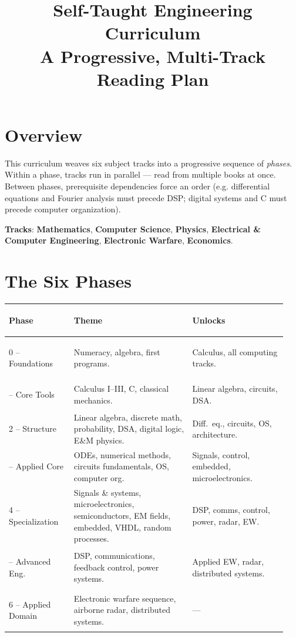 \documentclass[11pt]{article}
\title{\vspace{-2em}Self-Taught Engineering Curriculum\\\large A Progressive, Multi-Track Reading Plan}
\author{}
\date{}
\newcommand{\track}[2]{\textcolor{#1}{\textbf{#2}}}
\begin{document}
\maketitle
\vspace{-3em}

\section*{Overview}

This curriculum weaves six subject tracks into a progressive sequence of
\emph{phases}. Within a phase, tracks run in parallel --- read from multiple
books at once. Between phases, prerequisite dependencies force an order
(e.g. differential equations and Fourier analysis must precede DSP;
digital systems and C must precede computer organization).

\smallskip
\noindent\textbf{Tracks}:
\track{mathcol}{Mathematics},
\track{cscol}{Computer Science},
\track{phycol}{Physics},
\track{eececol}{Electrical \& Computer Engineering},
\track{ewcol}{Electronic Warfare},
\track{econcol}{Economics}.

\section{The Six Phases}

\renewcommand{\arraystretch}{1.2}
\begin{center}
{\small
\begin{tabular}{>{\bfseries\raggedright\arraybackslash}p{0.22\linewidth}
                >{\raggedright\arraybackslash}p{0.40\linewidth}
                >{\raggedright\arraybackslash}p{0.32\linewidth}}
\toprule
\textbf{Phase} & \textbf{Theme} & \textbf{Unlocks} \\
\midrule
\rowcolor{phaseband} 0 -- Foundations & Numeracy, algebra, first programs. & Calculus, all computing tracks. \\
1 -- Core Tools   & Calculus I--III, C, classical mechanics. & Linear algebra, circuits, DSA. \\
\rowcolor{phaseband} 2 -- Structure & Linear algebra, discrete math, probability, DSA, digital logic, E\&M physics. & Diff.\ eq., circuits, OS, architecture. \\
3 -- Applied Core & ODEs, numerical methods, circuits fundamentals, OS, computer org. & Signals, control, embedded, microelectronics. \\
\rowcolor{phaseband} 4 -- Specialization & Signals \& systems, microelectronics, semiconductors, EM fields, embedded, VHDL, random processes. & DSP, comms, control, power, radar, EW. \\
5 -- Advanced Eng. & DSP, communications, feedback control, power systems. & Applied EW, radar, distributed systems. \\
\rowcolor{phaseband} 6 -- Applied Domain & Electronic warfare sequence, airborne radar, distributed systems. & --- \\
\bottomrule
\end{tabular}
}
\end{center}
\end{document}

